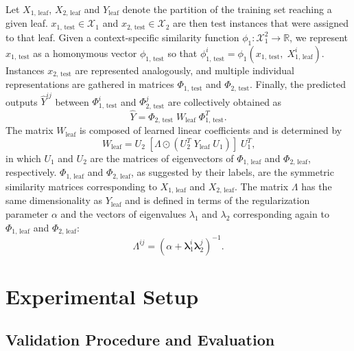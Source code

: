 \documentclass[letterpaper]{article}
\newcommand{\T}{^T}
\newcommand{\X}{\mathcal{X}}
\newcommand{\R}{\mathbb{R}}
\begin{document}
Let $X_\text{1, leaf}$, $X_\text{2, leaf}$ and $Y_\text{leaf}$ denote the partition of the training set reaching a given leaf.
$x_\text{1, test} \in \X_1$ and $x_\text{2, test} \in \X_2$ are then test instances that were assigned to that leaf.
Given a context-specific similarity function $\phi_1: \X_1^2 \to \R$, we represent $x_\text{1, test}$ as a homonymous vector $\phi_\text{1, test}$ so that $\phi^i_\text{1, test} = \phi_1(x_\text{1, test},\; X^i_\text{1, leaf})$. 
Instances $x_\text{2, test}$ are represented analogously, and multiple individual representations are gathered in matrices $\Phi_\text{1, test}$ and $\Phi_\text{2, test}$.
Finally, the predicted outputs $\hat Y^{ij}$ between $\Phi^i_\text{1, test}$ and $\Phi^j_\text{2, test}$ are collectively obtained as
\begin{equation}
    \label{eq:rlskron output}
    \hat Y = \Phi_\text{2, test} \; W_\text{leaf} \;\Phi\T_\text{1, test}
    \text{.}
\end{equation}
The matrix $W_\text{leaf}$ is composed of learned linear coefficients and is determined by
\begin{equation}
    \label{eq:rlskron w}
    W_\text{leaf} = U_2
    \;[
        \Lambda
        \odot (U_2\T \; Y_\text{leaf} \; U_1)
    ]\;
    U_1\T
    \text{,}
\end{equation}
in which $U_1$ and $U_2$ are the matrices of eigenvectors of $\Phi_\text{1, leaf}$ and $\Phi_\text{2, leaf}$, respectively. $\Phi_\text{1, leaf}$ and $\Phi_\text{2, leaf}$, as suggested by their labels, are the symmetric similarity matrices corresponding to $X_\text{1, leaf}$ and $X_\text{2, leaf}$. The matrix $\Lambda$ has the same dimensionality as $Y_\text{leaf}$ and is defined in terms of the regularization parameter $\alpha$ and the vectors of eigenvalues $\lambda_1$ and $\lambda_2$ corresponding again to $\Phi_\text{1, leaf}$ and $\Phi_\text{2, leaf}$:
\begin{equation}
    \textstyle
    \Lambda^{ij} = ({\alpha + \mathbf{\lambda}_1^i \mathbf{\lambda}_2^{j}})^{-1}
    \text{.}
\end{equation}


\section{Experimental Setup}
\label{sec:experimental setup}

\subsection{Validation Procedure and Evaluation}
\label{sec:bipartite validation}
\end{document}
